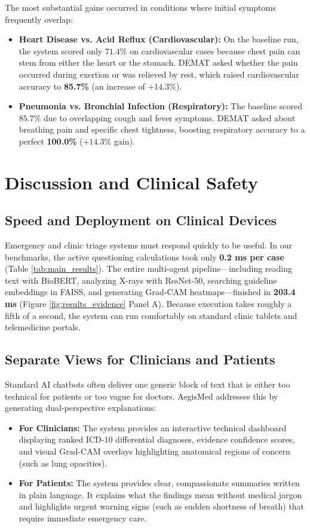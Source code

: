 \documentclass[10pt,twocolumn]{article}
\begin{document}
The most substantial gains occurred in conditions where initial symptoms frequently overlap:
\begin{itemize}
    \item \textbf{Heart Disease vs. Acid Reflux (Cardiovascular):} On the baseline run, the system scored only $71.4\%$ on cardiovascular cases because chest pain can stem from either the heart or the stomach. DEMAT asked whether the pain occurred during exertion or was relieved by rest, which raised cardiovascular accuracy to \textbf{85.7\%} (an increase of $+14.3\%$).
    \item \textbf{Pneumonia vs. Bronchial Infection (Respiratory):} The baseline scored $85.7\%$ due to overlapping cough and fever symptoms. DEMAT asked about breathing pain and specific chest tightness, boosting respiratory accuracy to a perfect \textbf{100.0\%} ($+14.3\%$ gain).
\end{itemize}

\section{Discussion and Clinical Safety}

\subsection{Speed and Deployment on Clinical Devices}
Emergency and clinic triage systems must respond quickly to be useful. In our benchmarks, the active questioning calculations took only \textbf{0.2 ms per case} (Table \ref{tab:main_results}). The entire multi-agent pipeline—including reading text with BioBERT, analyzing X-rays with ResNet-50, searching guideline embeddings in FAISS, and generating Grad-CAM heatmaps—finished in \textbf{203.4 ms} (Figure \ref{fig:results_evidence} Panel A). Because execution takes roughly a fifth of a second, the system can run comfortably on standard clinic tablets and telemedicine portals.

\subsection{Separate Views for Clinicians and Patients}
Standard AI chatbots often deliver one generic block of text that is either too technical for patients or too vague for doctors. AegisMed addresses this by generating dual-perspective explanations:
\begin{itemize}
    \item \textbf{For Clinicians:} The system provides an interactive technical dashboard displaying ranked ICD-10 differential diagnoses, evidence confidence scores, and visual Grad-CAM overlays highlighting anatomical regions of concern (such as lung opacities).
    \item \textbf{For Patients:} The system provides clear, compassionate summaries written in plain language. It explains what the findings mean without medical jargon and highlights urgent warning signs (such as sudden shortness of breath) that require immediate emergency care.
\end{itemize}
\end{document}
